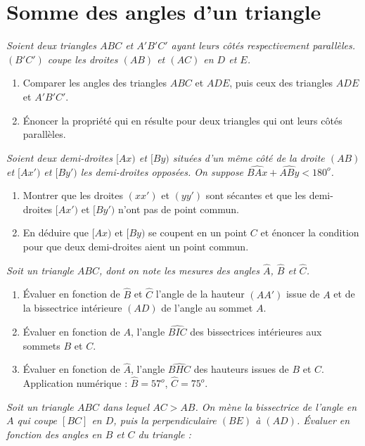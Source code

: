 \chapter{Somme des angles d'un triangle}

\begin{itemize}
\it Soient deux triangles $ABC$ et $A'B'C'$ ayant leurs côtés respectivement parallèles. $(B'C')$ coupe les droites $(AB)$ et $(AC)$ en $D$ et $E$. 
\begin{enumerate}
\item Comparer les angles des triangles $ABC$ et $ADE$, puis ceux des triangles $ADE$ et $A'B'C'$. 
\item Énoncer la propriété qui en résulte pour deux triangles qui ont leurs côtés parallèles.
\end{enumerate}
\it Soient deux demi-droites $[Ax)$ et $[By)$ situées d'un même côté de la droite $(AB)$ et $[Ax')$ et $[By')$ les demi-droites opposées. On suppose $\widehat{BAx}+\widehat{ABy}< 180^o$.
\begin{enumerate}
\item Montrer que les droites $(xx')$ et $(yy')$ sont sécantes et que les demi-droites $[Ax')$ et $[By')$ n'ont pas de point commun.
\item En déduire que $[Ax)$ et $[By)$ se coupent en un point $C$ et énoncer la condition pour que deux demi-droites aient un point commun. 
\end{enumerate}
\it Soit un triangle $ABC$, dont on note les mesures des angles $\widehat{A}$, $\widehat{B}$ et $\widehat{C}$.\begin{enumerate}
\item Évaluer en fonction de $\widehat{B}$ et $\widehat{C}$ l'angle de la hauteur $(AA')$ issue de $A$ et de la  bissectrice intérieure $(AD)$ de l'angle au sommet $A$.
\item Évaluer en fonction de $A$, l'angle $\widehat{BIC}$ des bissectrices intérieures aux sommets $B$ et $C$. 
\item Évaluer en fonction de $\widehat{A}$, l'angle $\widehat{BHC}$ des hauteurs issues de $B$ et $C$. \\
Application numérique : $\widehat{B} = 57^o$, $\widehat{C} = 75^o$.
\end{enumerate}
\it Soit un triangle $ABC$ dans lequel $AC>AB$. On mène la bissectrice de l'angle en $A$ qui coupe $[BC]$ en $D$, puis la perpendiculaire $(BE)$ à $(AD)$. Évaluer en fonction des angles en $B$ et $C$ du triangle : 
\begin{enumerate}

\end{enumerate}
\end{itemize}
